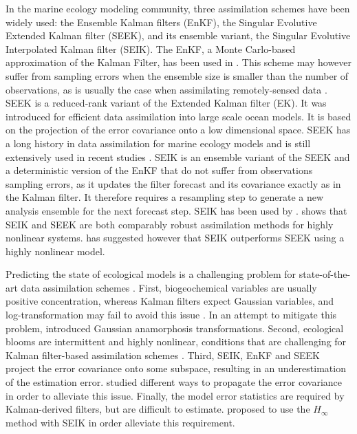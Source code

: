 In the marine ecology modeling community, three assimilation schemes have been
widely used: the Ensemble Kalman filters (EnKF), the Singular Evolutive
Extended Kalman filter (SEEK), and its ensemble variant, the Singular Evolutive
Interpolated Kalman filter (SEIK). The EnKF, a Monte Carlo-based approximation
of the Kalman Filter, has been used in \citet{Ciavatta2011, Ciavatta2014}. This
scheme may however suffer from sampling errors when the ensemble size is
smaller than the number of observations, as is usually the case when
assimilating remotely-sensed data \citep{Nerger2005, Altaf2014}.  SEEK is a
reduced-rank variant of the Extended Kalman filter (EK). It was introduced for
efficient data assimilation into large scale ocean models.  It is based  on the
projection of the error covariance onto a low dimensional space.  SEEK has a
long history in data assimilation for marine ecology models and is still
extensively used in recent studies \citep{Fontana2013, Korres2012,
Butenschon2012}.  SEIK is an ensemble variant of the SEEK  and a deterministic
version of the EnKF that do not suffer from observations sampling errors, as it
updates the filter forecast and its covariance exactly as in the Kalman filter.
It therefore requires a resampling step to generate a new analysis ensemble for
the next forecast step. SEIK has been used by \citet{Triantafyllou2013,
Korres2012}.  \citet{Korres2012} shows that SEIK and SEEK are both comparably
robust assimilation methods for highly nonlinear systems. \citet{Hoteit2005}
has suggested however that SEIK outperforms SEEK using a highly nonlinear
model.

Predicting the state of ecological models is a challenging problem for
state-of-the-art data assimilation schemes \citep{Edwards2015}. First,
biogeochemical variables are usually positive concentration, whereas Kalman
filters expect Gaussian variables, and log-transformation may fail to avoid
this issue \citep{Ciavatta2011}. In an attempt to mitigate this problem,
\citet{Fontana2013} introduced Gaussian anamorphosis transformations.  Second,
ecological blooms are intermittent and highly nonlinear, conditions that are
challenging for Kalman filter-based assimilation schemes \citep{Hoteit2005}.
Third, SEIK, EnKF and SEEK project the error covariance onto some subspace,
resulting in an underestimation of the estimation error. \citet{Butenschon2012}
studied different ways to propagate the error covariance in order to alleviate
this issue. Finally, the model error statistics are required by Kalman-derived
filters, but are difficult to estimate. \citet{Triantafyllou2013} proposed to
use the $H_\infty$ method with SEIK in order alleviate this requirement.


